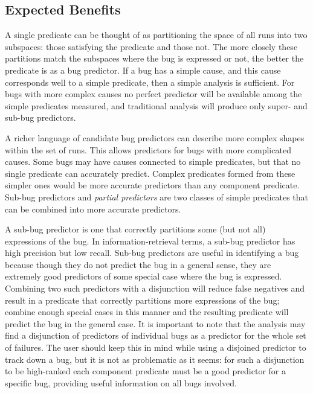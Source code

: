 \subsection{Expected Benefits}
A single predicate can be thought of as partitioning the space of all runs into two subspaces: those satisfying the predicate and those not.  The more closely these partitions match the subspaces where the bug is expressed or not, the better the predicate is as a bug predictor.  If a bug has a simple cause, and this cause corresponds well to a simple predicate, then a simple analysis is sufficient.  For bugs with more complex causes no perfect predictor will be available among the simple predicates measured, and traditional analysis will produce only super- and sub-bug predictors.

A richer language of candidate bug predictors can describe more complex shapes within the set of runs.  This allows predictors for bugs with more complicated causes.  Some bugs may have causes connected to simple predicates, but that no single predicate can accurately predict.  Complex predicates formed from these simpler ones would be more accurate predictors than any component predicate.  Sub-bug predictors and \emph{partial predictors} are two classes of simple predicates that can be combined into more accurate predictors.

A sub-bug predictor is one that correctly partitions some (but not all) expressions of the bug.  In information-retrieval terms, a sub-bug predictor has high precision but low recall.  Sub-bug predictors are useful in identifying a bug because though they do not predict the bug in a general sense, they are extremely good predictors of some special case where the bug is expressed.  Combining two such predictors with a disjunction will reduce false negatives and result in a predicate that correctly partitions more expressions of the bug; combine enough special cases in this manner and the resulting predicate will predict the bug in the general case.  It is important to note that the analysis may find a disjunction of predictors of individual bugs as a predictor for the whole set of failures.  The user should keep this in mind while using a disjoined predictor to track down a bug, but it is not as problematic as it seems: for such a disjunction to be high-ranked each component predicate must be a good predictor for a specific bug, providing useful information on all bugs involved.


